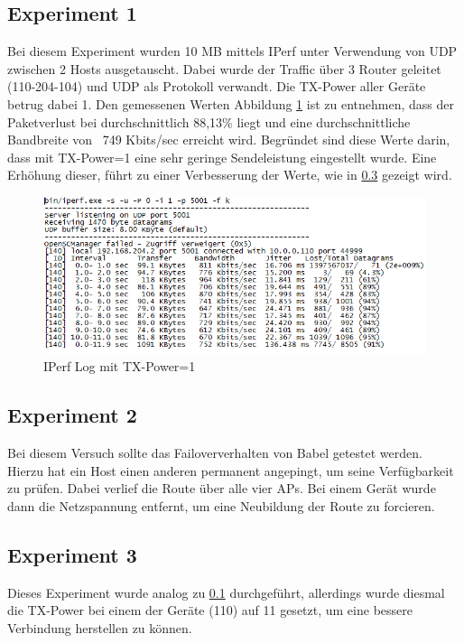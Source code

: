 \documentclass[10pt]{scrartcl}
\begin{document}
	\subsection{Experiment 1}\label{sec:babel_experiment1}
	Bei diesem Experiment wurden 10 MB mittels IPerf  unter Verwendung von UDP zwischen 2 Hosts ausgetauscht. Dabei wurde der Traffic über 3 Router geleitet (110-204-104) und UDP als Protokoll verwandt. Die TX-Power aller Geräte betrug dabei 1. 
Den gemessenen Werten Abbildung \ref{img:babel_iperf_tx1} ist zu entnehmen, dass der Paketverlust bei durchschnittlich 88,13\% liegt und eine durchschnittliche Bandbreite von ~749 Kbits/sec erreicht wird.
Begründet sind diese Werte darin, dass mit TX-Power=1 eine sehr geringe Sendeleistung eingestellt wurde. Eine Erhöhung dieser, führt zu einer Verbesserung der Werte, wie in \ref{sec:babel_experiment3} gezeigt wird.

	\begin{figure}
        \centering
                \includegraphics[width=\textwidth]{img/Babel_TX1_Protokoll}
        \caption{IPerf Log mit TX-Power=1}
        \label{img:babel_iperf_tx1}
	\end{figure}
	

	
	\subsection{Experiment 2}
	Bei diesem Versuch sollte das Failoververhalten von Babel getestet werden. Hierzu hat ein Host einen anderen permanent angepingt, um seine Verfügbarkeit zu prüfen. Dabei verlief die Route über alle vier APs. Bei einem Gerät wurde dann die Netzspannung entfernt, um eine Neubildung der Route zu forcieren.
	
	\subsection{Experiment 3}\label{sec:babel_experiment3}
	Dieses Experiment wurde analog zu \ref{sec:babel_experiment1} durchgeführt, allerdings wurde diesmal die TX-Power bei einem der Geräte (110) auf 11 gesetzt, um eine bessere Verbindung herstellen zu können.	
\end{document}
